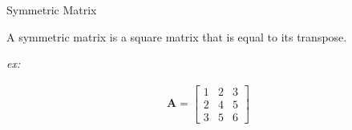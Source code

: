 Symmetric Matrix

\begin{solution}
A symmetric matrix is a square matrix that is equal to its transpose.

\emph{ex:}

\begin{align*}
    \boldsymbol{A} = \begin{bmatrix}
    1 & 2 & 3 \\ 2 & 4 & 5 \\ 3 & 5 & 6
    \end{bmatrix}
\end{align*}
\end{solution}